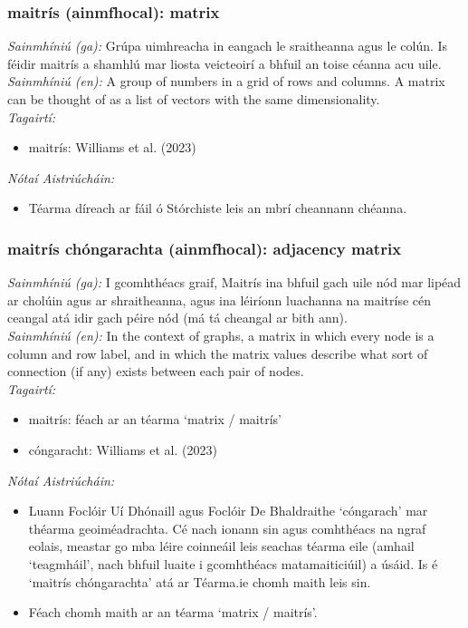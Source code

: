 \documentclass{article}
\begin{document}
\subsubsection*{maitrís (ainmfhocal): matrix}
 \noindent \textit{Sainmhíniú (ga):} Grúpa uimhreacha in eangach le sraitheanna agus le colún. Is féidir maitrís a shamhlú mar liosta veicteoirí a bhfuil an toise céanna acu uile.
\\
 \noindent \textit{Sainmhíniú (en):} A group of numbers in a grid of rows and columns. A matrix can be thought of as a list of vectors with the same dimensionality.
\\
 \noindent \textit{Tagairtí:}
\begin{itemize}
	\item maitrís: Williams et al. (2023) \cite{storchiste}
\end{itemize}

 \noindent \textit{Nótaí Aistriúcháin:}
\begin{itemize}
	\item Téarma díreach ar fáil ó Stórchiste leis an mbrí cheannann chéanna.
\end{itemize}


\subsubsection*{maitrís chóngarachta (ainmfhocal): adjacency matrix}
 \noindent \textit{Sainmhíniú (ga):} I gcomhthéacs graif, Maitrís ina bhfuil gach uile nód mar lipéad ar cholúin agus ar shraitheanna, agus ina léiríonn luachanna na maitríse cén ceangal atá idir gach péire nód (má tá cheangal ar bith ann).
\\
 \noindent \textit{Sainmhíniú (en):} In the context of graphs, a matrix in which every node is a column and row label, and in which the matrix values describe what sort of connection (if any) exists between each pair of nodes. 
\\
 \noindent \textit{Tagairtí:}
\begin{itemize}
	\item maitrís: féach ar an téarma `matrix / maitrís'
	\item cóngaracht: Williams et al. (2023) \cite{storchiste}
\end{itemize}

 \noindent \textit{Nótaí Aistriúcháin:}
\begin{itemize}
	\item Luann Foclóir Uí Dhónaill agus Foclóir De Bhaldraithe `cóngarach' mar théarma geoiméadrachta. Cé nach ionann sin agus comhthéacs na ngraf eolais, meastar go mba léire coinneáil leis seachas téarma eile (amhail `teagmháil', nach bhfuil luaite i gcomhthéacs matamaiticiúil) a úsáid. Is é `maitrís chóngarachta' atá ar Téarma.ie chomh maith leis sin.
	\item Féach chomh maith ar an téarma `matrix / maitrís'.
\end{itemize}
\end{document}
